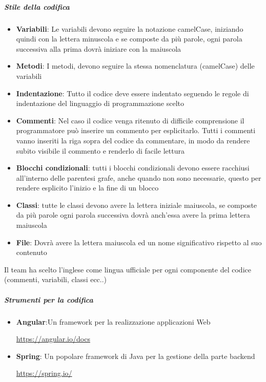 \documentclass[12pt]{article}
\begin{document}
\subparagraph{Stile della codifica} 
\begin{itemize}
    \item \textbf{Variabili}: Le variabili devono seguire la notazione camelCase, iniziando quindi con la lettera minuscola e se composte da più parole, ogni parola successiva alla prima dovrà iniziare con la maiuscola
    \item \textbf{Metodi}: I metodi, devono seguire la stessa nomenclatura (camelCase) delle variabili 
    \item \textbf{Indentazione}: Tutto il codice deve essere indentato seguendo le regole di indentazione del linguaggio di programmazione scelto
    \item \textbf{Commenti}: Nel caso il codice venga ritenuto di difficile comprensione il programmatore può inserire un commento per esplicitarlo. Tutti i commenti vanno inseriti la riga sopra del codice da commentare, in modo da rendere subito visibile il commento e renderlo di facile lettura
    \item \textbf{Blocchi condizionali}: tutti i blocchi condizionali devono essere racchiusi all'interno delle parentesi grafe, anche quando non sono necessarie, questo per rendere esplicito l'inizio e la fine di un blocco
    \item \textbf{Classi}: tutte le classi devono avere la lettera iniziale maiuscola, se composte da più parole ogni parola successiva dovrà anch'essa avere la prima lettera maiuscola
    \item \textbf{File}: Dovrà avere la lettera maiuscola ed un nome significativo rispetto al suo contenuto
\end{itemize}

Il team ha scelto l'inglese come lingua ufficiale per ogni componente del codice (commenti, variabili, classi ecc..)

\subparagraph{Strumenti per la codifica}
\begin{itemize}
    \item \textbf{Angular}:Un framework per la realizzazione applicazioni Web\\ 
    \begin{center}
        \url{https://angular.io/docs}
    \end{center}
    \item \textbf{Spring}: Un popolare framework di Java per la gestione della parte backend 
    \begin{center}
        \url{https://spring.io/}
    \end{center}
\end{itemize}
\end{document}
